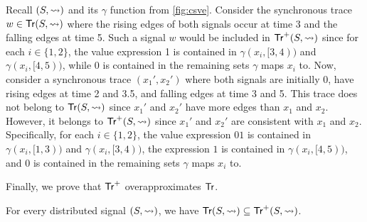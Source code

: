\begin{example} \label{ex:overapx}
	Recall \((S, {\rightsquigarrow})\) and its \(\gamma\) function from \cref{fig:csve}.
	Consider the synchronous trace \(w \in \mathsf{Tr}(S, {\rightsquigarrow})\) where the rising edges of both signals occur at time 3 and the falling edges at time 5.
	Such a signal \( w \) would be included in \(\mathsf{Tr}^+(S,{\rightsquigarrow})\) since for each \(i \in \{1,2\}\), the value expression 1 is contained in \(\gamma(x_i, [3,4))\) and \(\gamma(x_i, [4,5))\), while 0 is contained in the remaining sets \(\gamma\) maps \(x_i\) to.
	Now, consider a synchronous trace \((x_1', x_2')\) where both signals are initially 0, have rising edges at time 2 and 3.5, and falling edges at time 3 and 5.
	This trace does not belong to \(\mathsf{Tr}(S, {\rightsquigarrow})\) since \(x_1'\) and \(x_2'\) have more edges than \(x_1\) and \(x_2\).
	However, it belongs to \(\mathsf{Tr}^+(S,{\rightsquigarrow})\) since \(x_1'\) and \(x_2'\) are consistent with \(x_1\) and \(x_2\).
	Specifically, for each \(i \in \{1,2\}\), the value expression \(01\) is contained in \(\gamma(x_i, [1,3))\) and \(\gamma(x_i, [3,4))\), the expression \(1\) is contained in \(\gamma(x_i, [4,5))\), and 0 is contained in the remaining sets \(\gamma\) maps \(x_i\) to.
\end{example}

Finally, we prove that $\mathsf{Tr}^+$ overapproximates $\mathsf{Tr}$.

\begin{lemma} \label{cl:trsound}
	For every distributed signal $(S,{\rightsquigarrow})$, we have $\mathsf{Tr}(S,{\rightsquigarrow}) \subseteq \mathsf{Tr}^+(S,{\rightsquigarrow})$.
\end{lemma}

